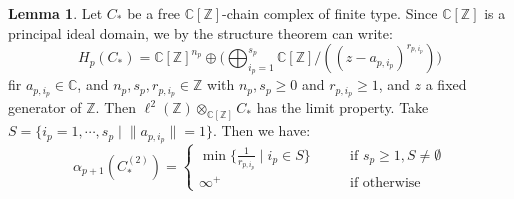 \documentclass[11pt]{report}
\theoremstyle{definition}
\newtheorem{Lemma}[Def]{Lemma}
\theoremstyle{plain}
\newcommand{\complex}{\mathbb{C}}
\newcommand{\integer}{\mathbb{Z}}
\newcommand{\norm}[1]{\lVert #1 \rVert}
\begin{document}
\begin{Lemma}\label{2.58}
	Let $C_*$ be a free $\complex[\integer]$-chain complex of finite type. Since $\complex[\integer]$ is a principal ideal domain, we by the structure theorem can write:
	\begin{equation}
	H_p(C_*)=\complex[\integer]^{n_p}\oplus \Bigg( \bigoplus_{i_p=1}^{s_p} \complex[\integer]/((z-a_{p, i_p})^{r_{p, i_p}})\Bigg)
	\end{equation}
	fir $a_{p, i_p}\in \complex$, and $n_p, s_p, r_{p, i_p}\in \integer$ with $n_p, s_p\geq 0$ and $r_{p, i_p}\geq 1$, and $z$ a fixed generator of $\integer$.  Then $\ell^2(\integer)\otimes_{\complex[\integer]}C_*$ has the limit property. 
	Take $S=\{i_p=1,\cdots, s_p\mid \norm{a_{p, i_p}}=1 \}$. Then we have:
	\begin{equation}
	\alpha_{p+1}(C_*^{(2)})=\begin{cases}
	\min\{\frac{1}{r_{p, i_p}}\mid i_p\in S \} &\qquad \text{if }s_p\geq 1, S\neq \emptyset\\
	\infty^+ &\qquad \text{if otherwise}
	\end{cases}
	\end{equation}
\end{Lemma}
\end{document}
